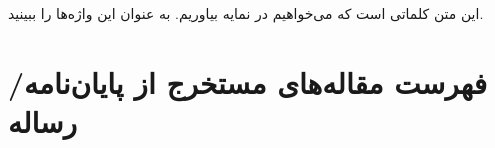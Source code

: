 \documentclass[msc]{AlzahraThesis}
\begin{document}
\begin{spacing}{1.5}

\tableofcontents
\IncludeNotationPage{

}

\listoftables
\newpage
\listoffigures
\newpage
\end{spacing}


\pagestyle{fancy}
\IncludePrefacePage{

}



این متن 
کلماتی است که می‌خواهیم در نمایه بیاوریم. به عنوان
این واژه‌ها را ببینید.

%
%

%




\pagestyle{empty}

\appendixMode








\newpage
\section*{فهرست مقاله‌های مستخرج از پایان‌نامه/رساله}
\end{document}
